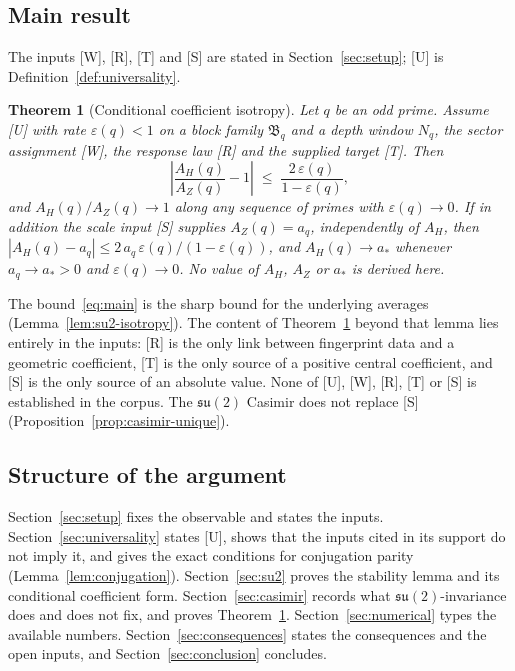 \documentclass[12pt,a4paper]{article}
\newtheorem{theorem}{Theorem}[section]
\theoremstyle{definition}
\theoremstyle{remark}
\newcommand{\Bq}{\mathfrak{B}_q}
\newcommand{\Nq}{N_q}
\begin{document}
    \subsection{Main result}

      The inputs [W], [R], [T] and [S] are stated in Section~\ref{sec:setup}; [U] is
      Definition~\ref{def:universality}.

      \begin{theorem}[Conditional coefficient isotropy]\label{thm:main}
        Let $q$ be an odd prime.
        Assume \textup{[U]} with rate $\varepsilon(q) < 1$ on a block family $\Bq$ and a depth window $\Nq$, the
        sector assignment \textup{[W]}, the response law \textup{[R]} and the supplied target \textup{[T]}.
        Then
        \begin{equation}\label{eq:main}
          \left|\frac{A_H(q)}{A_Z(q)} - 1\right| \;\leq\; \frac{2\,\varepsilon(q)}{1 - \varepsilon(q)} ,
        \end{equation}
        and $A_H(q)/A_Z(q) \to 1$ along any sequence of primes with $\varepsilon(q) \to 0$.
        If in addition the scale input \textup{[S]} supplies $A_Z(q) = a_q$, independently of $A_H$, then
        $|A_H(q) - a_q| \leq 2\,a_q\,\varepsilon(q)/(1-\varepsilon(q))$, and $A_H(q) \to a_*$ whenever
        $a_q \to a_* > 0$ and $\varepsilon(q) \to 0$.
        No value of $A_H$, $A_Z$ or $a_*$ is derived here.
      \end{theorem}

      The bound~\eqref{eq:main} is the sharp bound for the underlying averages (Lemma~\ref{lem:su2-isotropy}).
      The content of Theorem~\ref{thm:main} beyond that lemma lies entirely in the inputs: [R] is the only link
      between fingerprint data and a geometric coefficient, [T] is the only source of a positive central
      coefficient, and [S] is the only source of an absolute value.
      None of [U], [W], [R], [T] or [S] is established in the corpus.
      The $\mathfrak{su}(2)$ Casimir does not replace [S] (Proposition~\ref{prop:casimir-unique}).

    \subsection{Structure of the argument}

      Section~\ref{sec:setup} fixes the observable and states the inputs.
      Section~\ref{sec:universality} states [U], shows that the inputs cited in its support do not imply it, and
      gives the exact conditions for conjugation parity (Lemma~\ref{lem:conjugation}).
      Section~\ref{sec:su2} proves the stability lemma and its conditional coefficient form.
      Section~\ref{sec:casimir} records what $\mathfrak{su}(2)$-invariance does and does not fix, and proves
      Theorem~\ref{thm:main}.
      Section~\ref{sec:numerical} types the available numbers.
      Section~\ref{sec:consequences} states the consequences and the open inputs, and Section~\ref{sec:conclusion}
      concludes.
\end{document}
